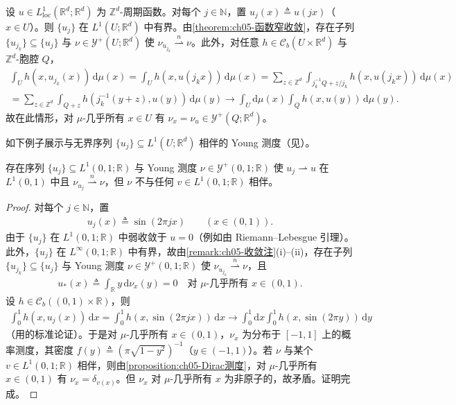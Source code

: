 \documentclass[../../main.tex]{subfiles}%
\begin{document}
\begin{remark}\label{remark:ch05-周期}
设 $u\in L^1_\mathrm{loc}(\mathbb{R}^d;\mathbb{R}^d)$ 为 $\mathbb{Z}^d$-周期函数。对每个 $j\in\mathbb{N}$，置 $u_j(x)\triangleq u(jx)$（$x\in U$）。则 $\{u_j\}$ 在 $L^1(U;\mathbb{R}^d)$ 中有界。由\cref{theorem:ch05-函数窄收敛}，存在子列 $\{u_{j_k}\}\subseteq\{u_j\}$ 与 $\nu\in\mathcal{Y}^+(U;\mathbb{R}^d)$ 使 $\nu_{u_{j_k}}\stackrel{n}{\rightharpoonup}\nu$。此外，对任意 $h\in\mathcal{C}_b(U\times\mathbb{R}^d)$ 与 $\mathbb{Z}^d$-胞腔 $Q$，
\begin{align*}
\int_U h(x,u_{j_k}(x))\,\mathrm{d}\mu(x)
=\int_U h(x,u(j_kx))\,\mathrm{d}\mu(x)
=\sum_{z\in\mathbb{Z}^d}\int_{j_k^{-1}Q+z/j_k}h(x,u(j_kx))\,\mathrm{d}\mu(x)\\
=\sum_{z\in\mathbb{Z}^d}\int_{Q+z}h(j_k^{-1}(y+z),u(y))\,\mathrm{d}\mu(y)\to\int_U\mathrm{d}\mu(x)\int_Q h(x,u(y))\,\mathrm{d}\mu(y).
\end{align*}
故在此情形，对 $\mu$-几乎所有 $x\in U$ 有 $\nu_x=\nu_u\in\mathcal{Y}^+(Q;\mathbb{R}^d)$。
\end{remark}

如下例子展示与无界序列 $\{u_j\}\subseteq L^1(U;\mathbb{R}^d)$ 相伴的 Young 测度（见\cite[Example 1.1]{ref92}）。

\begin{proposition}\label{proposition:ch05-非相伴}
存在序列 $\{u_j\}\subseteq L^1(0,1;\mathbb{R})$ 与 Young 测度 $\nu\in\mathcal{Y}^+(0,1;\mathbb{R})$ 使 $u_j\rightharpoonup u$ 在 $L^1(0,1)$ 中且 $\nu_{u_j}\stackrel{n}{\rightharpoonup}\nu$，但 $\nu$ 不与任何 $v\in L^1(0,1;\mathbb{R})$ 相伴。
\end{proposition}

\begin{proof}
对每个 $j\in\mathbb{N}$，置
\begin{align*}
u_j(x)\triangleq \sin(2\pi jx)\qquad(x\in(0,1)).
\end{align*}
由于 $\{u_j\}$ 在 $L^1(0,1;\mathbb{R})$ 中弱收敛于 $u=0$（例如由 Riemann–Lebesgue 引理）。此外，$\{u_j\}$ 在 $L^\infty(0,1;\mathbb{R})$ 中有界，故由\cref{remark:ch05-收敛注}(i)–(ii)，存在子列 $\{u_{j_k}\}\subseteq\{u_j\}$ 与 Young 测度 $\nu\in\mathcal{Y}^+(0,1;\mathbb{R})$ 使 $\nu_{u_{j_k}}\stackrel{n}{\rightharpoonup}\nu$，且
\begin{align*}
u_*(x)\triangleq \int_{\mathbb{R}}y\,\mathrm{d}\nu_x(y)=0
\quad\text{对 }\mu\text{-几乎所有 }x\in(0,1).
\end{align*}
设 $h\in\mathcal{C}_b((0,1)\times\mathbb{R})$，则
\begin{align*}
\int_0^1 h(x,u_j(x))\,\mathrm{d}x=\int_0^1 h(x,\sin(2\pi jx))\,\mathrm{d}x\to\int_0^1\mathrm{d}x\int_0^1 h(x,\sin(2\pi y))\,\mathrm{d}y
\end{align*}
（用\cite[Lemma 2.37]{ref45}的标准论证）。于是对 $\mu$-几乎所有 $x\in(0,1)$，$\nu_x$ 为分布于 $[-1,1]$ 上的概率测度，其密度 $f(y)\triangleq (\pi\sqrt{1-y^2})^{-1}$（$y\in(-1,1)$）。若 $\nu$ 与某个 $v\in L^1(0,1;\mathbb{R})$ 相伴，则由\cref{proposition:ch05-Dirac测度}，对 $\mu$-几乎所有 $x\in(0,1)$ 有 $\nu_x=\delta_{v(x)}$。但 $\nu_x$ 对 $\mu$-几乎所有 $x$ 为非原子的，故矛盾。证明完成。
\end{proof}
\end{document}
